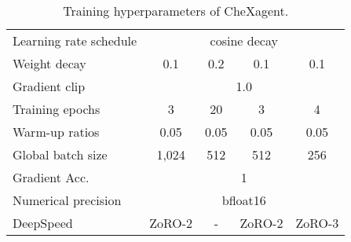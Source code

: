 \begin{table}[t]
{\begin{tabular}{@{}lcccc@{}}
Learning rate schedule                  & \multicolumn{4}{c}{cosine decay}                                                                                                                   \\
Weight decay                            & 0.1                               & 0.2                      & 0.1                                  & 0.1                                          \\
Gradient clip                           & \multicolumn{4}{c}{1.0}                                                                                                                            \\
Training epochs                         & 3                                 & 20                       & 3                                    & 4                                            \\
Warm-up ratios                          & 0.05                              & 0.05                     & 0.05                                 & 0.05                                         \\
Global batch size                       & 1,024                             & 512                      & 512                                  & 256                                          \\
Gradient Acc.                           & \multicolumn{4}{c}{1}                                                                                                                              \\
Numerical precision                     & \multicolumn{4}{c}{bfloat16}                                                                                                                       \\
DeepSpeed                               & ZoRO-2                            & -                        & ZoRO-2                               & ZoRO-3                                       \\ \bottomrule
\end{tabular}}
\caption{Training hyperparameters of CheXagent.}
\label{table:hyperparameters}
\end{table}
